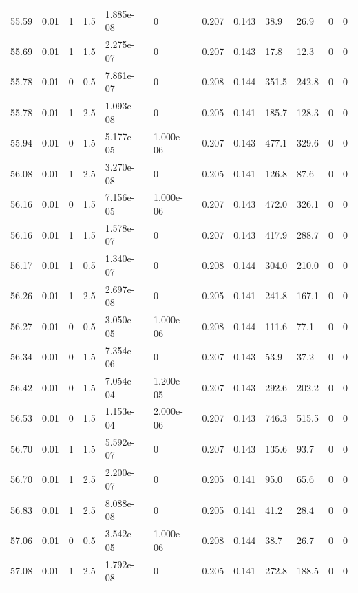 \documentclass[preview]{standalone}
\begin{document}
{{{{{{{{{{{{{{{{{{\begin{tabular}{L{1.2cm}C{1.2cm} C{0.3cm}C{0.5cm} C{1.4cm}C{1.4cm} C{1.4cm}C{1.4cm} C{1.6cm}C{1.6cm} C{1.6cm}C{1.6cm}}
  55.59  &  0.01  & 1     & 1.5 &  1.885e-08  & 0  &  0.207&   0.143& 38.9 & 26.9   &  0 & 0  \\ 
  55.69  &  0.01  & 1     & 1.5 &  2.275e-07  & 0  &  0.207&   0.143& 17.8 & 12.3   &  0 & 0  \\ 
  55.78  &  0.01  & 0     & 0.5 &  7.861e-07  & 0  &  0.208&   0.144& 351.5 & 242.8   &  0 & 0  \\ 
  55.78  &  0.01  & 1     & 2.5 &  1.093e-08  & 0  &  0.205&   0.141& 185.7 & 128.3   &  0 & 0  \\ 
  55.94  &  0.01  & 0     & 1.5 &  5.177e-05  & 1.000e-06  &  0.207&   0.143& 477.1 & 329.6   &  0 & 0  \\ 
  56.08  &  0.01  & 1     & 2.5 &  3.270e-08  & 0  &  0.205&   0.141& 126.8 & 87.6   &  0 & 0  \\ 
  56.16  &  0.01  & 0     & 1.5 &  7.156e-05  & 1.000e-06  &  0.207&   0.143& 472.0 & 326.1   &  0 & 0  \\ 
  56.16  &  0.01  & 1     & 1.5 &  1.578e-07  & 0  &  0.207&   0.143& 417.9 & 288.7   &  0 & 0  \\ 
  56.17  &  0.01  & 1     & 0.5 &  1.340e-07  & 0  &  0.208&   0.144& 304.0 & 210.0   &  0 & 0  \\ 
  56.26  &  0.01  & 1     & 2.5 &  2.697e-08  & 0  &  0.205&   0.141& 241.8 & 167.1   &  0 & 0  \\ 
  56.27  &  0.01  & 0     & 0.5 &  3.050e-05  & 1.000e-06  &  0.208&   0.144& 111.6 & 77.1   &  0 & 0  \\ 
  56.34  &  0.01  & 0     & 1.5 &  7.354e-06  & 0  &  0.207&   0.143& 53.9 & 37.2   &  0 & 0  \\ 
  56.42  &  0.01  & 0     & 1.5 &  7.054e-04  & 1.200e-05  &  0.207&   0.143& 292.6 & 202.2   &  0 & 0  \\ 
  56.53  &  0.01  & 0     & 1.5 &  1.153e-04  & 2.000e-06  &  0.207&   0.143& 746.3 & 515.5   &  0 & 0  \\ 
  56.70  &  0.01  & 1     & 1.5 &  5.592e-07  & 0  &  0.207&   0.143& 135.6 & 93.7   &  0 & 0  \\ 
  56.70  &  0.01  & 1     & 2.5 &  2.200e-07  & 0  &  0.205&   0.141& 95.0 & 65.6   &  0 & 0  \\ 
  56.83  &  0.01  & 1     & 2.5 &  8.088e-08  & 0  &  0.205&   0.141& 41.2 & 28.4   &  0 & 0  \\ 
  57.06  &  0.01  & 0     & 0.5 &  3.542e-05  & 1.000e-06  &  0.208&   0.144& 38.7 & 26.7   &  0 & 0  \\ 
  57.08  &  0.01  & 1     & 2.5 &  1.792e-08  & 0  &  0.205&   0.141& 272.8 & 188.5   &  0 & 0  \\ 

\end{tabular}}}}}}}}}}}}}}}}}}}
\end{document}
